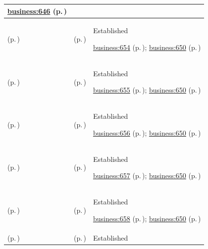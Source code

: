 \begin{longtable}{|>{\raggedright\arraybackslash}p{0.27\TableWidth}|>{\raggedright\arraybackslash}p{0.27\TableWidth}|>{\raggedright\arraybackslash}p{0.46\TableWidth}|}
 \hyperref[rad:business:646]{business:646} (p.\,\pageref{rad:business:646})\\\hline
\nameref{cap:bc-health-information-management} (p.\,\pageref{cap:bc-health-information-management}) & \nameref{cap:bc-health-information-data-management} (p.\,\pageref{cap:bc-health-information-data-management}) & Established

 \hyperref[rad:business:652]{business:654} (p.\,\pageref{rad:business:652}); \hyperref[rad:business:650]{business:650} (p.\,\pageref{rad:business:650})\\\hline
\nameref{cap:bc-health-information-management} (p.\,\pageref{cap:bc-health-information-management}) & \nameref{cap:bc-health-information-structure-management} (p.\,\pageref{cap:bc-health-information-structure-management}) & Established

 \hyperref[rad:business:652]{business:655} (p.\,\pageref{rad:business:652}); \hyperref[rad:business:650]{business:650} (p.\,\pageref{rad:business:650})\\\hline
\nameref{cap:bc-health-information-management} (p.\,\pageref{cap:bc-health-information-management}) & \nameref{cap:bc-health-information-lifecycle-management} (p.\,\pageref{cap:bc-health-information-lifecycle-management}) & Established

 \hyperref[rad:business:652]{business:656} (p.\,\pageref{rad:business:652}); \hyperref[rad:business:650]{business:650} (p.\,\pageref{rad:business:650})\\\hline
\nameref{cap:bc-health-information-management} (p.\,\pageref{cap:bc-health-information-management}) & \nameref{cap:bc-health-information-catalogue-and-index-management} (p.\,\pageref{cap:bc-health-information-catalogue-and-index-management}) & Established

 \hyperref[rad:business:652]{business:657} (p.\,\pageref{rad:business:652}); \hyperref[rad:business:650]{business:650} (p.\,\pageref{rad:business:650})\\\hline
\nameref{cap:bc-health-information-management} (p.\,\pageref{cap:bc-health-information-management}) & \nameref{cap:bc-health-information-compartmentalisation} (p.\,\pageref{cap:bc-health-information-compartmentalisation}) & Established

 \hyperref[rad:business:652]{business:658} (p.\,\pageref{rad:business:652}); \hyperref[rad:business:650]{business:650} (p.\,\pageref{rad:business:650})\\\hline
\nameref{cap:bc-health-information-management} (p.\,\pageref{cap:bc-health-information-management}) & \nameref{cap:bc-health-information-data-correlation} (p.\,\pageref{cap:bc-health-information-data-correlation}) & Established


\end{longtable}
